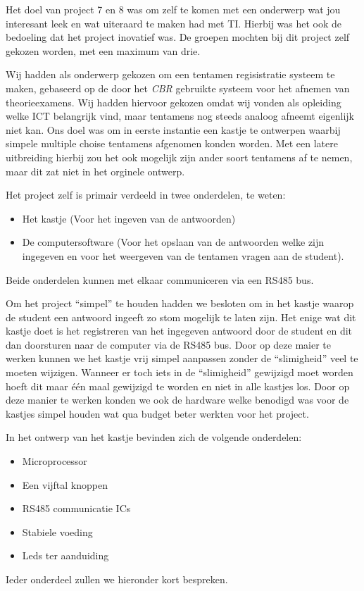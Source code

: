 Het doel van project 7 en 8 was om zelf te komen met een onderwerp wat jou interesant leek en wat uiteraard te maken had met TI. Hierbij was het ook de bedoeling dat het project inovatief was. De groepen mochten bij dit project zelf gekozen worden, met een maximum van drie.

Wij hadden als onderwerp gekozen om een tentamen regisistratie systeem te maken, gebaseerd op de door het \emph{CBR} gebruikte systeem voor het afnemen van theorieexamens. Wij hadden hiervoor gekozen omdat wij vonden als opleiding welke ICT belangrijk vind, maar tentamens nog steeds analoog afneemt eigenlijk niet kan. Ons doel was om in eerste instantie een kastje te ontwerpen waarbij simpele multiple choise tentamens afgenomen konden worden. Met een latere uitbreiding hierbij zou het ook mogelijk zijn ander soort tentamens af te nemen, maar dit zat niet in het orginele ontwerp.

Het project zelf is primair verdeeld in twee onderdelen, te weten:
\begin{itemize}
  \item Het kastje (Voor het ingeven van de antwoorden)
  \item De computersoftware (Voor het opslaan van de antwoorden welke zijn ingegeven en voor het weergeven van de tentamen vragen aan de student).
\end{itemize}
Beide onderdelen kunnen met elkaar communiceren via een RS485 bus. 

Om het project ``simpel'' te houden hadden we besloten om in het kastje waarop de student een antwoord ingeeft zo stom mogelijk te laten zijn. Het enige wat dit kastje doet is het registreren van het ingegeven antwoord door de student en dit dan doorsturen naar de computer via de RS485 bus. Door op deze maier te werken kunnen we het kastje vrij simpel aanpassen zonder de ``slimigheid'' veel te moeten wijzigen. Wanneer er toch iets in de ``slimigheid'' gewijzigd moet worden hoeft dit maar \'{e}\'{e}n maal gewijzigd te worden en niet in alle kastjes los. Door op deze manier te werken konden we ook de hardware welke benodigd was voor de kastjes simpel houden wat qua budget beter werkten voor het project. 

In het ontwerp van het kastje bevinden zich de volgende onderdelen:
\begin{itemize}
  \item Microprocessor
  \item Een vijftal knoppen
  \item RS485 communicatie ICs
  \item Stabiele voeding
  \item Leds ter aanduiding
\end{itemize}
Ieder onderdeel zullen we hieronder kort bespreken.


